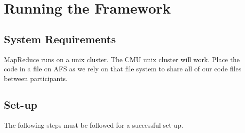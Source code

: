 \documentclass[12pt]{article}
\begin{document}
\maketitle

\pagebreak
\section{Running the Framework}

\subsection{System Requirements}

MapReduce runs on a unix cluster. The CMU unix cluster will work. Place the code in a file on AFS as we rely on that file system to share all of our code files between participants.

\subsection{Set-up}

The following steps must be followed for a successful set-up.
\end{document}
